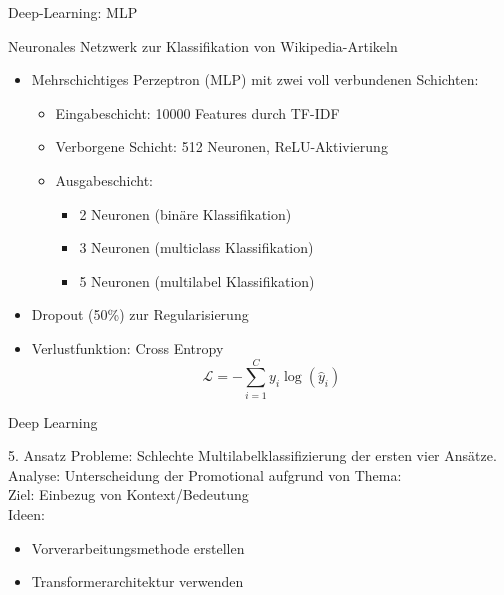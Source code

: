 \documentclass[aspectratio=169]{beamer} %
\begin{document}
\begin{frame}{Deep-Learning: MLP}
    \begin{block}{Neuronales Netzwerk zur Klassifikation von Wikipedia-Artikeln}
        \begin{itemize}
            \item Mehrschichtiges Perzeptron (MLP) mit zwei voll verbundenen Schichten:
                  \begin{itemize}
                      \item Eingabeschicht: 10000 Features durch TF-IDF
                      \item Verborgene Schicht: 512 Neuronen, ReLU-Aktivierung
                      \item Ausgabeschicht:
                            \begin{itemize}
                                \item 2 Neuronen (binäre Klassifikation)
                                \item 3 Neuronen (multiclass Klassifikation)
                                \item 5 Neuronen (multilabel Klassifikation)
                            \end{itemize}
                  \end{itemize}
            \item Dropout (50\%) zur Regularisierung
            \item Verlustfunktion: Cross Entropy
                  \begin{equation*}
                      \mathcal{L} = - \sum_{i=1}^{C} y_i \log(\hat{y}_i)
                  \end{equation*}
        \end{itemize}
    \end{block}
\end{frame}


\begin{frame}{Deep Learning}
    \begin{block}{5. Ansatz}
        Probleme: Schlechte Multilabelklassifizierung der ersten vier Ansätze. \\
        Analyse: Unterscheidung der Promotional aufgrund von Thema: \\
        Ziel:
        Einbezug von Kontext/Bedeutung \\
        Ideen:
        \begin{itemize}
            \item Vorverarbeitungsmethode erstellen
            \item Transformerarchitektur verwenden
        \end{itemize}
    \end{block}
\end{frame}
\end{document}
